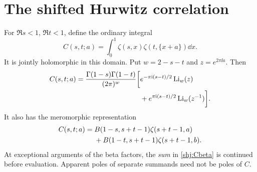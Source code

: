 \section{The shifted Hurwitz correlation}\label{shj:master}
\begin{proposition}\label{shj:masterthm}
For $\Re s<1$, $\Re t<1$, define the ordinary integral
\begin{equation}\label{shj:Cdef}
C(s,t;a)=\int_0^1\zeta(s,x)\zeta(t,\{x+a\})\dd x.
\end{equation}
It is jointly holomorphic in this domain. Put $w=2-s-t$ and $z=e^{2\pi\ii a}$. Then
\begin{align}
C(s,t;a)=\frac{\Gamma(1-s)\Gamma(1-t)}{(2\pi)^w}
\bigg[&e^{-\pi\mathrm{i}(s-t)/2}\operatorname{Li}_w(z)\notag\\
&+e^{\pi\mathrm{i}(s-t)/2}\operatorname{Li}_w(z^{-1})\bigg].
\label{shj:Cpoly}
\end{align}
It also has the meromorphic representation
\begin{align}
C(s,t;a)={}&B(1-s,s+t-1)\zeta(s+t-1,a)\notag\\
&+B(1-t,s+t-1)\zeta(s+t-1,b).
\label{shj:Cbeta}
\end{align}
At exceptional arguments of the beta factors, the \emph{sum} in \eqref{shj:Cbeta} is continued before evaluation. Apparent poles of separate summands need not be poles of $C$.
\end{proposition}

